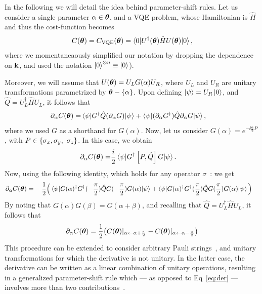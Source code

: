In the following we will detail the idea behind parameter-shift rules. Let us consider a single parameter $\alpha \in \bm{\theta}$, and a VQE problem, whose Hamiltonian is $\hat{H}$ and thus the cost-function becomes %
\begin{equation}
C(\bm{\theta}) = C_{\text{VQE}}(\bm{\theta})= \mathinner{\langle 0|U^\dagger(\bm{\theta}) \hat{H}U(\bm{\theta})|0\rangle},
\end{equation}
where we momentaneaously simplified our notation by dropping the dependence on $\mathbf{k}$, and used the notation $\ket{0}^{\otimes n} \equiv \ket{0}$).

Moreover, we will assume that $U(\bm{\theta}) = U_L G(\alpha) U_R$, where $U_L$ and $U_R$ are unitary transformations parametrized by $\bm{\theta} - \lbrace \alpha\rbrace$. Upon defining $\ket{\psi} = U_R \ket{0}$, and $\hat{Q} = U_L^\dagger \hat{H}U_L$, it follows that
\begin{align}\label{eq:shifted}
\partial_\alpha C(\bm{\theta}) =& \mathinner{\langle \psi |G^\dagger \hat{Q} (\partial_\alpha G)| \psi\rangle} + \mathinner{\langle \psi |(\partial_\alpha G^\dagger) \hat{Q} \partial_\alpha G| \psi\rangle},\end{align}
where we used $G$ as a shorthand for $G(\alpha)$. Now, let us consider $G(\alpha) = e^{-\ii \frac{\alpha}{2} P}$, %
with $P \in \llaves{\sigma_x, \sigma_y, \sigma_z}$. In this case, we obtain
\begin{align}
\partial_\alpha C(\bm{\theta}) =& \frac{i}{2}\mathinner{\langle \psi |G^\dagger \left[P,\hat{Q}\right] G |\psi\rangle}.\end{align}
Now, using the following identity, which holds for any operator $\sigma$~\cite{shiftrules1}:
we get
\begin{align*}
\partial_\alpha C(\bm{\theta}) =& -\frac{1}{2}\Big(\mathinner{\langle \psi |G(\alpha)^\dagger G^\dagger(-\frac{\pi}{2}) \hat{Q} G(-\frac{\pi}{2}) G(\alpha)|  \psi\rangle}  + \mathinner{\langle \psi |G(\alpha)^\dagger G^\dagger(\frac{\pi}{2}) \hat{Q} G(\frac{\pi}{2}) G(\alpha)|  \psi\rangle} \Big)
\end{align*}
By noting that $G(\alpha)G(\beta) = G(\alpha + \beta)$, and recalling that $\hat{Q} = U_L^\dagger \hat{H}U_L$, it follows that
\begin{equation}\label{eq:der}
\partial_\alpha C(\bm{\theta}) = \frac{1}{2}\big(C(\bm{\theta})|_{\alpha \leftarrow \alpha + \frac{\pi}{2}} - C(\bm{\theta})|_{\alpha \leftarrow \alpha - \frac{\pi}{2}}\big)
\end{equation}
This procedure can be extended to consider arbitrary Pauli strings~\cite{shiftrules1}, and unitary transformations for which the derivative is not unitary. In the latter case, the derivative can be written as a linear combination of unitary operations, resulting in a generalized parameter-shift rule which --- as opposed to Eq~\ref{eq:der} --- involves more than two contributions~\cite{shiftrules2, Wierichs2022generalparameter}.

